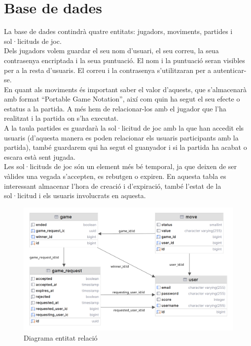 \section{Base de dades}
La base de dades contindrà quatre entitats: jugadors, moviments, partides i sol·licituds de joc.
\\[3mm]
Dels jugadors volem guardar el seu nom d'usuari, el seu correu, la seua contrasenya encriptada i la seua puntuació. El nom i la puntuació seran visibles per a la resta d’usuaris. El correu i la contrasenya s’utilitzaran per a autenticar-se.
\\[3mm]
En quant als moviments és important saber el valor d'aquests, que s’almacenarà amb format “Portable Game Notation”, així com quin ha segut el seu efecte o estatus a la partida. A més hem de relacionar-los amb el jugador que l'ha realitzat i la partida on s'ha executat.
\\[3mm]
A la taula partides es guardarà la sol·licitud de joc amb la que han accedit els usuaris (d'aquesta manera es poden relacionar els usuaris participants amb la partida), també guardarem qui ha segut el guanyador i si la partida ha acabat o escara està sent jugada.
\\[3mm]
Les sol·licituds de joc són un element més bé temporal, ja que deixen de ser vàlides una vegada s'accepten, es rebutgen o expiren.
En aquesta tabla es interessant almacenar l'hora de creació i d'expiració, també l'estat de la sol·licitud i els usuaris involucrats en aquesta.
\begin{figure}[H]
    \centering
    \includegraphics[width=\textwidth]{images/entitat-relacio.png}
    \caption{Diagrama entitat relació}
    \label{fig:Diagrama entitat relació}
\end{figure}